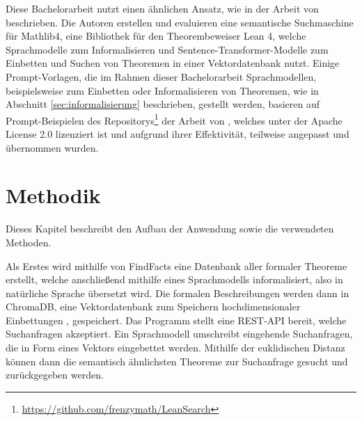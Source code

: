 \documentclass[12pt,letterpaper]{article} %
\begin{document}
Diese Bachelorarbeit nutzt einen ähnlichen Ansatz, wie in der Arbeit von \citet{gao_semantic_2025} beschrieben.
Die Autoren erstellen und evaluieren eine semantische Suchmaschine für Mathlib4, eine Bibliothek für den Theorembeweiser Lean 4, welche Sprachmodelle zum Informalisieren und Sentence-Transformer-Modelle zum Einbetten und Suchen von Theoremen in einer Vektordatenbank nutzt.
Einige Prompt-Vorlagen, die im Rahmen dieser Bachelorarbeit Sprachmodellen, beispielsweise zum Einbetten oder Informalisieren von Theoremen, wie in Abschnitt \ref{sec:informalisierung} beschrieben, gestellt werden, basieren auf Prompt-Beispielen des Repositorys\footnote{\url{https://github.com/frenzymath/LeanSearch}} der Arbeit von \citet{gao_semantic_2025}, welches unter der Apache License 2.0 lizenziert ist und aufgrund ihrer Effektivität, teilweise angepasst und übernommen wurden.


\section{Methodik}

Dieses Kapitel beschreibt den Aufbau der Anwendung sowie die verwendeten Methoden.

Als Erstes wird mithilfe von FindFacts \citep{huch_findfacts_2022} eine Datenbank aller formaler Theoreme erstellt, welche anschließend mithilfe eines Sprachmodells informalisiert, also in natürliche Sprache übersetzt wird.
Die formalen Beschreibungen werden dann in ChromaDB, eine Vektordatenbank zum Speichern hochdimensionaler Einbettungen \citep[S. 2]{sheng_lprotector_2024}, gespeichert.
Das Programm stellt eine REST-API bereit, welche Suchanfragen akzeptiert.
Ein Sprachmodell umschreibt eingehende Suchanfragen, die in Form eines Vektors eingebettet werden.
Mithilfe der euklidischen Distanz können dann die semantisch ähnlichsten Theoreme zur Suchanfrage gesucht und zurückgegeben werden.
\end{document}
